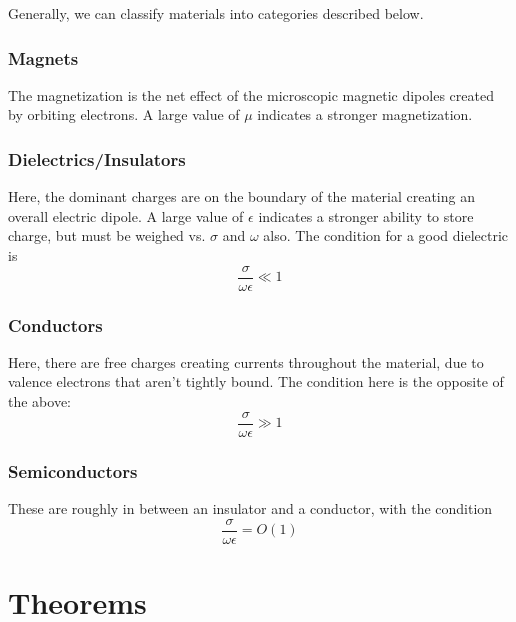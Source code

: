 \documentclass{article}
\numberwithin{equation}{section}
\begin{document}
Generally, we can classify materials into categories described below.

\subsubsection{Magnets} The magnetization is the net effect of the microscopic magnetic dipoles created by orbiting electrons. A large value of $\mu$ indicates a stronger magnetization.
\subsubsection{Dielectrics/Insulators}
Here, the dominant charges are on the boundary of the material creating an overall electric dipole. A large value of $\epsilon$ indicates a stronger ability to store charge, but must be weighed vs. $\sigma$ and $\omega$ also. The condition for a good dielectric is
    \begin{equation} 
        \frac{\sigma}{\omega \epsilon} \ll 1
    \end{equation}
\subsubsection{Conductors}
Here, there are free charges creating currents throughout the material, due to valence electrons that aren't tightly bound. The condition here is the opposite of the above:
    \begin{equation} \label{eq:conductor}
        \frac{\sigma}{\omega \epsilon} \gg 1
    \end{equation}
\subsubsection{Semiconductors}
These are roughly in between an insulator and a conductor, with the condition
    \begin{equation} \label{eq:semiconductor}
        \frac{\sigma}{\omega \epsilon} = O(1)
    \end{equation}
\newpage
\section{Theorems}
\end{document}
